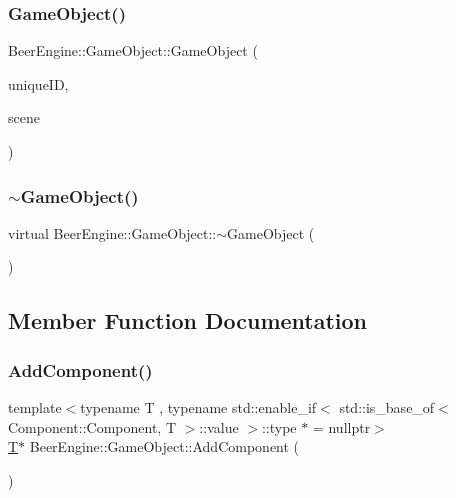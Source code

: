 \subsubsection{\texorpdfstring{Game\+Object()}{GameObject()}}
{\footnotesize\ttfamily Beer\+Engine\+::\+Game\+Object\+::\+Game\+Object (\begin{DoxyParamCaption}\item[{int}]{unique\+ID,  }\item[{\mbox{\hyperlink{class_beer_engine_1_1_a_scene}{A\+Scene}} \&}]{scene }\end{DoxyParamCaption})}

\mbox{\label{class_beer_engine_1_1_game_object_a7e5c50ce01ec2831aaf489271a77297e}} 
\subsubsection{\texorpdfstring{$\sim$\+Game\+Object()}{~GameObject()}}
{\footnotesize\ttfamily virtual Beer\+Engine\+::\+Game\+Object\+::$\sim$\+Game\+Object (\begin{DoxyParamCaption}\item[{void}]{ }\end{DoxyParamCaption})\hspace{0.3cm}{\ttfamily [virtual]}}



\subsection{Member Function Documentation}
\mbox{\label{class_beer_engine_1_1_game_object_a62e1af180bc3c2cd12c06153ac06aa3a}} 
\subsubsection{\texorpdfstring{Add\+Component()}{AddComponent()}}
{\footnotesize\ttfamily template$<$typename T , typename std\+::enable\+\_\+if$<$ std\+::is\+\_\+base\+\_\+of$<$ Component\+::\+Component, T $>$\+::value $>$\+::type $\ast$  = nullptr$>$ \\
\mbox{\hyperlink{namespace_beer_engine_a94f0b552f6dc910de8cdb44207981f53a8de48e594408f9fc561b2f68ce05f664}{T}}$\ast$ Beer\+Engine\+::\+Game\+Object\+::\+Add\+Component (\begin{DoxyParamCaption}\item[{void}]{ }\end{DoxyParamCaption})\hspace{0.3cm}{\ttfamily [inline]}}

